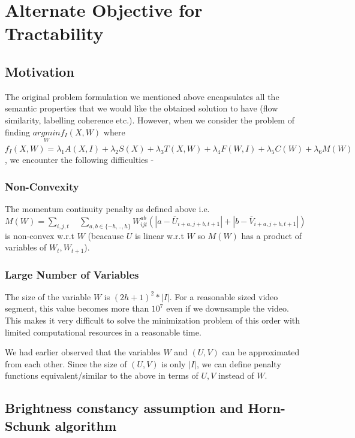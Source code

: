 \section{Alternate Objective for Tractability}


\subsection{Motivation}

The original problem formulation we mentioned above encapsulates all
the semantic properties that we would like the obtained solution to
have (flow similarity, labelling coherence etc.). However, when we
consider the problem of finding $\underset{W}{argmin}f_{I}(X,W)$
where $f_{I}(X,W)=\lambda_{1}A(X,I)+\lambda_{2}S(X)+\lambda_{3}T(X,W)+\lambda_{4}F(W,I)+\lambda_{5}C(W)+\lambda_{6}M(W)$,
we encounter the following difficulties -


\subsubsection*{Non-Convexity}

The momentum continuity penalty as defined above i.e. $M(W)=\underset{i,j,t}{\sum}\quad\underset{a,b\in\{-h,..,h\}}{\sum}W_{ijt}^{ab}(|a-\overline{U}_{i+a,j+b,t+1}|+|b-\overline{V}_{i+a,j+b,t+1}|)$
is non-convex w.r.t $W$ (beacause $U$ is linear w.r.t $W$ so $M(W)$
has a product of variables of $W_{t},W_{t+1}$).


\subsubsection*{Large Number of Variables}

The size of the variable $W$ is $(2h+1)^{2}*|I|$. For a reasonable
sized video segment, this value becomes more than $10^{7}$ even if
we downsample the video. This makes it very difficult to solve the
minimization problem of this order with limited computational resources
in a reasonable time.

\medskip{}


We had earlier observed that the variables $W$ and $(U,V)$ can be
approximated from each other. Since the size of $(U,V)$ is only $|I|$,
we can define penalty functions equivalent/similar to the above in
terms of $U,V$ instead of $W$.


\subsection{Brightness constancy assumption and Horn-Schunk algorithm}

